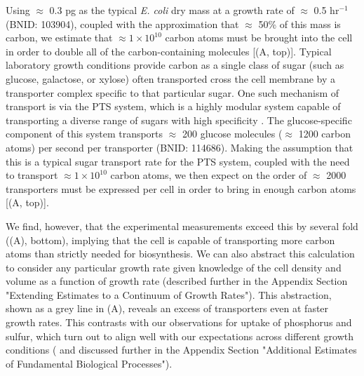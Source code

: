 Using $\approx$ 0.3 pg as the typical \textit{E. coli} dry mass at a growth rate
of $\approx$ 0.5 hr$^{-1}$ (BNID: 103904), coupled with the approximation that
$\approx$ 50\% of this mass is carbon, we estimate that $\approx 1\times 10^{10}$ carbon
atoms must be brought into the cell in order to double all of the
carbon-containing molecules [(A, top)]. Typical laboratory
growth conditions provide carbon as a single class of sugar (such as glucose,
galactose, or xylose) often transported cross the cell membrane by a transporter
complex specific to that particular sugar. One such mechanism of transport is
via the PTS system, which is a highly modular system capable of transporting a
diverse range of sugars with high specificity \citep{escalante2012}. The
glucose-specific component of this system transports $\approx$ 200 glucose
molecules ($\approx$ 1200 carbon atoms) per second per transporter (BNID:
114686). Making the assumption that this is a typical sugar transport rate for
the PTS system, coupled with the need to transport $\approx 1 \times 10^{10}$ carbon atoms,
we then expect on the order of $\approx$ 2000 transporters must be expressed per
cell in order to bring in enough carbon atoms [(A, top)].

We find, however, that the experimental measurements exceed this by several
fold ((A), bottom), implying that the cell is capable of
transporting more carbon atoms than strictly needed for biosynthesis. We can
also abstract this calculation to consider any particular growth rate given
knowledge of the cell density and volume as a function of growth rate
(described further in the Appendix Section "Extending Estimates to a
Continuum of Growth Rates"). This abstraction, shown as a grey line in
(A), reveals an excess of transporters even at faster
growth rates. This contrasts with our observations for uptake of phosphorus
and sulfur, which turn out to align well with our expectations across
different growth conditions ( and
discussed further in the Appendix Section "Additional Estimates of
Fundamental Biological Processes").

